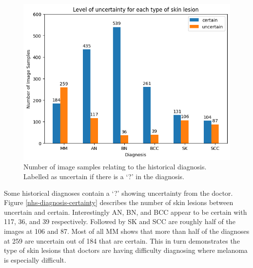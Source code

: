 \begin{figure}
    \centering
    \includegraphics[scale=0.75]{images/nhs/nhs-diagnosis-certainty.png}
    \caption{Number of image samples relating to the historical diagnosis. Labelled as uncertain if there is a `?' in the diagnosis.} 
\end{figure}\label{nhs-diagnosis-certainty}

Some historical diagnoses contain a `?' showing uncertainty from the doctor. Figure \ref{nhs-diagnosis-certainty} describes the number of skin lesions between uncertain and certain. Interestingly AN, BN, and BCC appear to be certain with 117, 36, and 39 respectively. Followed by SK and SCC are roughly half of the images at 106 and 87. Most of all MM shows that more than half of the diagnoses at 259 are uncertain out of 184 that are certain. This in turn demonstrates the type of skin lesions that doctors are having difficulty diagnosing where melanoma is especially difficult.


